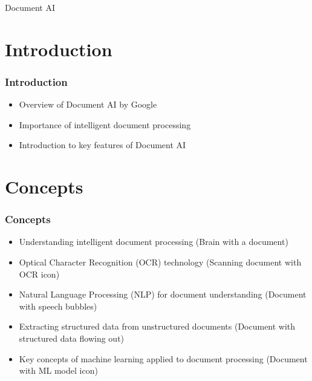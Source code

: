 \begin{frame}[fragile]\frametitle{}
\begin{center}
{\Large Document AI}
\end{center}
\end{frame}

\section{Introduction}

\begin{frame}[fragile]\frametitle{Introduction}
  \begin{itemize}
    \item Overview of Document AI by Google
    \item Importance of intelligent document processing
    \item Introduction to key features of Document AI
  \end{itemize}
\end{frame}

\section{Concepts}

\begin{frame}[fragile]\frametitle{Concepts}
  \begin{itemize}
    \item Understanding intelligent document processing (Brain with a document)
    \item Optical Character Recognition (OCR) technology (Scanning document with OCR icon)
    \item Natural Language Processing (NLP) for document understanding (Document with speech bubbles)
    \item Extracting structured data from unstructured documents (Document with structured data flowing out)
    \item Key concepts of machine learning applied to document processing (Document with ML model icon)
  \end{itemize}
\end{frame}

